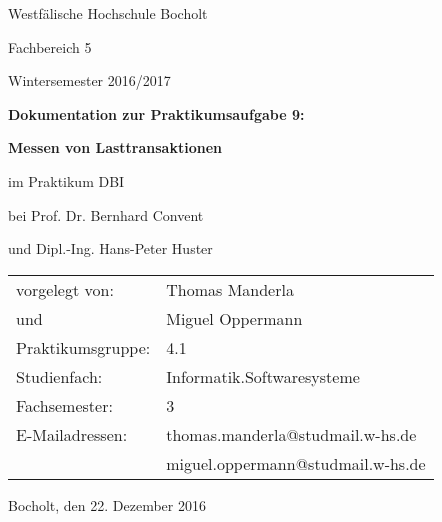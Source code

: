 \documentclass[a4paper, bibliography=totoc, 12pt]{scrartcl}
\begin{document}
\thispagestyle{empty}
	\begin{titlepage}
		\begin{center}
		
		Westfälische Hochschule Bocholt
		
		Fachbereich 5
				
		Wintersemester 2016/2017
		
		\vspace*{1cm}
		
		
		\vspace*{1.2cm}
		
		\LARGE \textbf{Dokumentation zur Praktikumsaufgabe 9:}
		
		\Large \textbf{Messen von Lasttransaktionen}
		
		\vspace*{0,1cm}
		
		\large im Praktikum \glqq DBI\grqq
		\vspace*{0,1cm}
		
		bei Prof. Dr. Bernhard Convent
		
		und Dipl.-Ing. Hans-Peter Huster
		
		\vspace*{0.7cm}
		
		
		\end{center}
	
	\vspace*{4.9cm} 
	\normalsize
		\begin{tabular}{ll}
		
		vorgelegt von: &Thomas Manderla\\
		und&Miguel Oppermann\\
		Praktikumsgruppe: &4.1\\
		Studienfach: &Informatik.Softwaresysteme\\
		Fachsemester: &3\\
		E-Mailadressen: &thomas.manderla@studmail.w-hs.de\\
		&miguel.oppermann@studmail.w-hs.de\\
		
		\end{tabular}
		
	\vspace*{1cm}
	Bocholt, den 22. Dezember 2016	
	
	\end{titlepage}
	\thispagestyle{empty}
	
\end{document}
